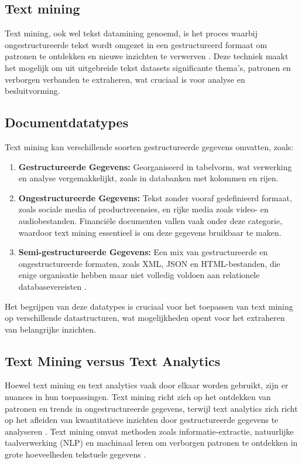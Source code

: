 \subsection{Text mining}
Text mining, ook wel tekst datamining genoemd, is het proces waarbij ongestructureerde tekst wordt omgezet in een gestructureerd formaat om patronen te ontdekken en nieuwe inzichten te verwerven \autocite{IBM2024}. Deze techniek maakt het mogelijk om uit uitgebreide tekst datasets significante thema’s, patronen en verborgen verbanden te extraheren, wat cruciaal is voor analyse en besluitvorming.

\subsection{Documentdatatypes}

Text mining kan verschillende soorten gestructureerde gegevens omvatten, zoals:

\begin{enumerate}
    \item \textbf{Gestructureerde Gegevens:} Georganiseerd in tabelvorm, wat verwerking en analyse vergemakkelijkt, zoals in databanken met kolommen en rijen.
    \item \textbf{Ongestructureerde Gegevens:} Tekst zonder vooraf gedefinieerd formaat, zoals sociale media of productrecensies, en rijke media zoals video- en audiobestanden. Financiële documenten vallen vaak onder deze categorie, waardoor text mining essentieel is om deze gegevens bruikbaar te maken.
    \item \textbf{Semi-gestructureerde Gegevens:} Een mix van gestructureerde en ongestructureerde formaten, zoals XML, JSON en HTML-bestanden, die enige organisatie hebben maar niet volledig voldoen aan relationele databasevereisten \autocite{AWS2024}.
\end{enumerate}

Het begrijpen van deze datatypes is cruciaal voor het toepassen van text mining op verschillende datastructuren, wat mogelijkheden opent voor het extraheren van belangrijke inzichten.

\subsection{Text Mining versus Text Analytics}

Hoewel text mining en text analytics vaak door elkaar worden gebruikt, zijn er nuances in hun toepassingen. Text mining richt zich op het ontdekken van patronen en trends in ongestructureerde gegevens, terwijl text analytics zich richt op het afleiden van kwantitatieve inzichten door gestructureerde gegevens te analyseren \autocite{IBM2024}. Text mining omvat methoden zoals informatie-extractie, natuurlijke taalverwerking (NLP) en machinaal leren om verborgen patronen te ontdekken in grote hoeveelheden tekstuele gegevens \autocite{gaikwad2014text}.

